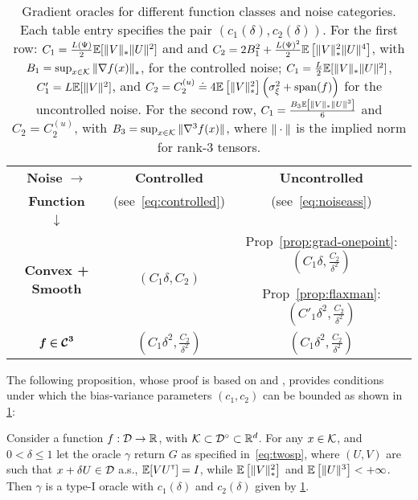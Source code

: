 \begin{table}
\small
\centering
\begin{tabular}{|c|c|c|}
\toprule
\textbf{Noise }$\bm{ \rightarrow}$ & \textbf{Controlled } & \textbf{Uncontrolled } \\
\textbf{Function } &(see~\eqref{eq:controlled})&(see~\eqref{eq:noiseass})\\
$\bm{\downarrow}$ &&\\\midrule
\multirow{3}{*}{\textbf{Convex + Smooth}} & \multirow{3}{*}{$(C_1 \delta, C_2)$} & %
{Prop~\ref{prop:grad-onepoint}: $(C_1\delta, \frac{C_2}{\delta^2}) $}\\
&& \\
 &&{Prop~\ref{prop:flaxman}: $(C'_1\delta^2, \frac{C_2}{\delta^2}) $}\\\midrule
\multirow{2}{*}{$\bm{f \in \mathcal{C}^3}$} & \multirow{2}{*}{$(C_1 \delta^2, \frac{C_2}{\delta^2})$} & \multirow{2}{*}{$(C_1 \delta^2, \frac{C_2}{\delta^2})$} \\
 &&\\\bottomrule
\end{tabular}
\caption{Gradient oracles for different function classes and noise categories. Each table entry specifies the pair $(c_1(\delta), c_2(\delta))$.
For the first row:  
$C_1 = \frac{L(\Psi)}{2} \mathbb{E}[ \|V\|_* \|U\|^2]$ and 
and
$C_2 =  2 B_1^2  + \frac{ L(\Psi)^2}{2}\mathbb{E}\left[ \|V\|_*^2 \|U\|^4 \right]$, with $B_1 = \sup_{x\in \mathcal{K}} \left\|\nabla f(x)\right\|_*$, for the controlled noise;
$C_1 =
\frac{L}{2} \mathbb{E}[ \|V\|_* \|U\|^2]$, $C'_1=L \mathbb{E}[\|V\|^2]$,  and
 $C_2 =  C_{2}^{(u)} \doteq 4 \mathbb{E}\left[\|V\|_*^2\right]\left( \sigma_\xi^2+\operatorname{span}(f)\right)$ for the uncontrolled noise.
For the second row, $C_1 = \frac{B_3 \mathbb{E}\left[ \|V\|_* \|U\|^3 \right]}{6}$ and $C_2 =  C_{2}^{(u)}$,
with $B_3 = \sup_{x\in \mathcal{K}} \|\nabla^3 f(x)\|$, where $\|\cdot\|$ is the implied norm for rank-3 tensors.
}
\label{tab:oracles}
\end{table}
The following proposition, whose proof is based on \citep[Lemma~1]{spall1992multivariate} and \citep[Lemma~1]{duchi2015optimal}, provides conditions under which the bias-variance parameters $(c_1,c_2)$ can be bounded as shown in \cref{tab:oracles}:
\begin{proposition}
\label{prop:grad-spsa}
Consider a function $f:\mathcal{D} \to \mathbb{R}$, with $\mathcal{K} \subset \mathcal{D}^\circ \subset \mathbb{R}^d$. %
For any $x \in \mathcal{K}$, and $0< \delta \le 1$ let the oracle $\gamma$ return $G$ as specified in~\eqref{eq:twosp},
where $(U,V)$ are such that $x+\delta U \in \mathcal{D}$ a.s.,
$\mathbb{E}[V U^\mathsf{\scriptscriptstyle T}] = I$, while
$\mathbb{E}\left[\|V\|_*^2\right]$ and $\mathbb{E}\left[ \|U\|^3 \right]<+\infty$.
Then $\gamma$ is a type-I oracle with $c_1(\delta)$ and $c_2(\delta)$ given by \cref{tab:oracles}.
\end{proposition}
